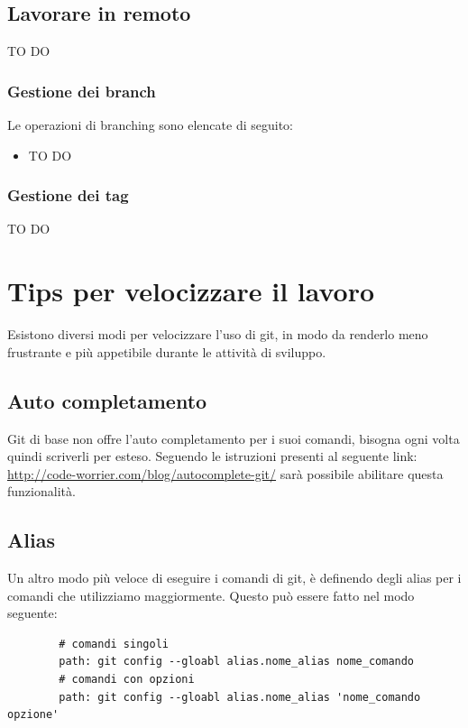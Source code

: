 
	\subsection{Lavorare in remoto} %
	\label{sub:lavorare_in_remoto}
	TO DO
		\subsubsection{Gestione dei branch} %
		\label{ssub:gestione_dei_branch_remoto}
		Le operazioni di branching sono elencate di seguito:
			\begin{itemize}
				\item TO DO
			\end{itemize}

		\subsubsection{Gestione dei tag} %
		\label{ssub:gestione_dei_tag_remoto}
		TO DO



\newpage \clearpage
\section{Tips per velocizzare il lavoro} %
\label{sec:tips_per_velocizzare_il_lavoro}
Esistono diversi modi per velocizzare l'uso di git, in modo da renderlo meno frustrante e più appetibile durante le attività di sviluppo.
	\subsection{Auto completamento} %
	\label{sub:auto_completamento}
	Git di base non offre l'auto completamento per i suoi comandi, bisogna ogni volta quindi scriverli per esteso. Seguendo le istruzioni presenti al seguente link: \url{http://code-worrier.com/blog/autocomplete-git/} sarà possibile abilitare questa funzionalità.

	\subsection{Alias} %
	\label{sub:alias}
	Un altro modo più veloce di eseguire i comandi di git, è definendo degli alias per i comandi che utilizziamo maggiormente. Questo può essere fatto nel modo seguente:
	\begin{verbatim}
		# comandi singoli
		path: git config --gloabl alias.nome_alias nome_comando
		# comandi con opzioni
		path: git config --gloabl alias.nome_alias 'nome_comando opzione'
	\end{verbatim}


